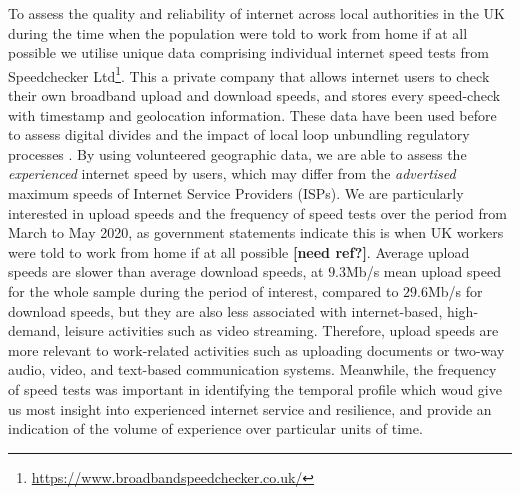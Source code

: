 \documentclass[]{interact}
\theoremstyle{plain}%
\theoremstyle{definition}
\theoremstyle{remark}
\begin{document}
To assess the quality and reliability of internet across local
authorities in the UK during the time when the population were told to
work from home if at all possible we utilise unique data comprising
individual internet speed tests from Speedchecker Ltd\footnote{\url{https://www.broadbandspeedchecker.co.uk/}}.
This a private company that allows internet users to check their own
broadband upload and download speeds, and stores every speed-check with
timestamp and geolocation information. These data have been used before
to assess digital divides \citep{riddlesden2014broadband} and the impact
of local loop unbundling regulatory processes
\citep{nardotto2015unbundling}. By using volunteered geographic data, we
are able to assess the \emph{experienced} internet speed by users, which
may differ from the \emph{advertised} maximum speeds of Internet Service
Providers (ISPs). We are particularly interested in upload speeds and
the frequency of speed tests over the period from March to May 2020, as
government statements indicate this is when UK workers were told to work
from home if at all possible \textbf{{[}need ref?{]}}. Average upload
speeds are slower than average download speeds, at \(9.3\)Mb/s mean
upload speed for the whole sample during the period of interest,
compared to \(29.6\)Mb/s for download speeds, but they are also less
associated with internet-based, high-demand, leisure activities such as
video streaming. Therefore, upload speeds are more relevant to
work-related activities such as uploading documents or two-way audio,
video, and text-based communication systems. Meanwhile, the frequency of
speed tests was important in identifying the temporal profile which woud
give us most insight into experienced internet service and resilience,
and provide an indication of the volume of experience over particular
units of time.
\end{document}
